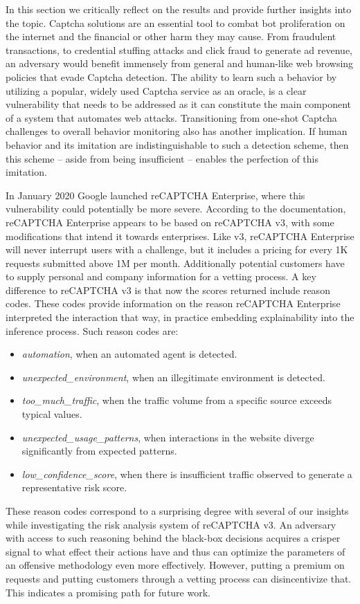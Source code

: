 In this section we critically reflect on the results and provide further insights into the topic.
Captcha solutions are an essential tool to combat bot proliferation on the internet and the financial or other harm they may cause.
From fraudulent transactions, to credential stuffing attacks and click fraud to generate ad revenue, an adversary would benefit immensely from general and human-like web browsing policies that evade Captcha detection.
The ability to learn such a behavior by utilizing a popular, widely used Captcha service as an oracle, is a clear vulnerability that needs to be addressed as it can constitute the main component of a system that automates web attacks.
Transitioning from one-shot Captcha challenges to overall behavior monitoring also has another implication.
If human behavior and its imitation are indistinguishable to such a detection scheme, then this scheme -- aside from being insufficient -- enables the perfection of this imitation.

In January 2020 Google launched reCAPTCHA Enterprise, where this vulnerability could potentially be more severe.
According to the documentation, reCAPTCHA Enterprise appears to be based on reCAPTCHA v3, with some modifications that intend it towards enterprises.
Like v3, reCAPTCHA Enterprise will never interrupt users with a challenge, but it includes a pricing for every 1K requests submitted above 1M per month.
Additionally potential customers have to supply personal and company information for a vetting process.
A key difference to reCAPTCHA v3 is that now the scores returned include reason codes.
These codes provide information on the reason reCAPTCHA Enterprise interpreted the interaction that way, in practice embedding explainability into the inference process.
Such reason codes are:
\begin{itemize}
  \item \textit{automation}, when an automated agent is detected.
  \item \textit{unexpected\_environment}, when an illegitimate environment is detected.
  \item \textit{too\_much\_traffic}, when the traffic volume from a specific source exceeds typical values.
  \item \textit{unexpected\_usage\_patterns}, when interactions in the website diverge significantly from expected patterns.
  \item \textit{low\_confidence\_score}, when there is insufficient traffic observed to generate a representative risk score.
\end{itemize}
These reason codes correspond to a surprising degree with several of our insights while investigating the risk analysis system of reCAPTCHA v3.
An adversary with access to such reasoning behind the black-box decisions acquires a crisper signal to what effect their actions have and thus can optimize the parameters of an offensive methodology even more effectively.
However, putting a premium on requests and putting customers through a vetting process can disincentivize that.
This indicates a promising path for future work.

